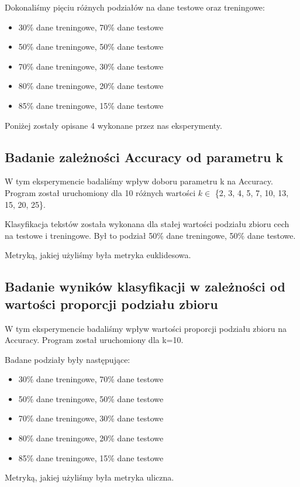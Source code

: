 \documentclass{classrep}
\begin{document}
Dokonaliśmy pięciu różnych podziałów na dane testowe oraz treningowe:
\begin{itemize}
\item 30\% dane treningowe, 70\% dane testowe
\item 50\% dane treningowe, 50\% dane testowe
\item 70\% dane treningowe, 30\% dane testowe
\item 80\% dane treningowe, 20\% dane testowe
\item 85\% dane treningowe, 15\% dane testowe
\end{itemize}

Poniżej zostały opisane 4 wykonane przez nas eksperymenty.

\subsection{Badanie zależności Accuracy od parametru k}

W tym eksperymencie badaliśmy wpływ doboru parametru k na Accuracy. Program został uruchomiony dla 10 różnych wartości $k\in$ \{2, 3, 4, 5, 7, 10, 13, 15, 20, 25\}.

Klasyfikacja tekstów została wykonana dla stałej wartości podziału zbioru cech na testowe i treningowe. Był to podział 50\% dane treningowe, 50\% dane testowe.

Metryką, jakiej użyliśmy była metryka euklidesowa.

\subsection{Badanie wyników klasyfikacji w zależności od wartości proporcji podziału zbioru}

W tym eksperymencie badaliśmy wpływ wartości proporcji podziału zbioru na Accuracy. Program został uruchomiony dla k=10.

Badane podziały były następujące:
\begin{itemize}
	\item 30\% dane treningowe, 70\% dane testowe
	\item 50\% dane treningowe, 50\% dane testowe
	\item 70\% dane treningowe, 30\% dane testowe
	\item 80\% dane treningowe, 20\% dane testowe
	\item 85\% dane treningowe, 15\% dane testowe
\end{itemize}

Metryką, jakiej użyliśmy była metryka uliczna.
\end{document}
